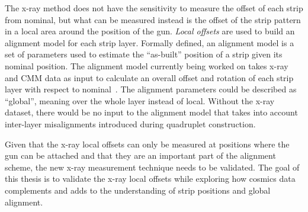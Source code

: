 The x-ray method does not have the sensitivity to measure the offset of each strip from nominal, but what can be measured instead is the offset of the strip pattern in a local area around the position of the gun. \textit{Local offsets} are used to build an alignment model for each strip layer. Formally defined, an alignment model is a set of parameters used to estimate the ``as-built'' position of a strip given its nominal position. The alignment model currently being worked on takes x-ray and CMM data as input to calculate an overall offset and rotation of each strip layer with respect to nominal~\cite{lefebvre_precision_2020}. The alignment parameters could be described as ``global'', meaning over the whole layer instead of local. Without the x-ray dataset, there would be no input to the alignment model that takes into account inter-layer misalignments introduced during quadruplet construction.

Given that the x-ray local offsets can only be measured at positions where the gun can be attached and that they are an important part of the alignment scheme, the new x-ray measurement technique needs to be validated. The goal of this thesis is to validate the x-ray local offsets while exploring how cosmics data complements and adds to the understanding of strip positions and global alignment.



